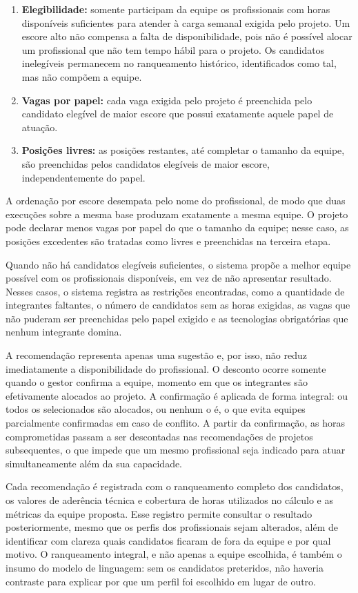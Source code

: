 \begin{enumerate}
    \item \textbf{Elegibilidade:} somente participam da equipe os profissionais com horas disponíveis suficientes para atender à carga semanal exigida pelo projeto. Um escore alto não compensa a falta de disponibilidade, pois não é possível alocar um profissional que não tem tempo hábil para o projeto. Os candidatos inelegíveis permanecem no ranqueamento histórico, identificados como tal, mas não compõem a equipe.
    \item \textbf{Vagas por papel:} cada vaga exigida pelo projeto é preenchida pelo candidato elegível de maior escore que possui exatamente aquele papel de atuação.
    \item \textbf{Posições livres:} as posições restantes, até completar o tamanho da equipe, são preenchidas pelos candidatos elegíveis de maior escore, independentemente do papel.
\end{enumerate}

A ordenação por escore desempata pelo nome do profissional, de modo que duas execuções sobre a mesma base produzam exatamente a mesma equipe. O projeto pode declarar menos vagas por papel do que o tamanho da equipe; nesse caso, as posições excedentes são tratadas como livres e preenchidas na terceira etapa.

Quando não há candidatos elegíveis suficientes, o sistema propõe a melhor equipe possível com os profissionais disponíveis, em vez de não apresentar resultado. Nesses casos, o sistema registra as restrições encontradas, como a quantidade de integrantes faltantes, o número de candidatos sem as horas exigidas, as vagas que não puderam ser preenchidas pelo papel exigido e as tecnologias obrigatórias que nenhum integrante domina.

A recomendação representa apenas uma sugestão e, por isso, não reduz imediatamente a disponibilidade do profissional. O desconto ocorre somente quando o gestor confirma a equipe, momento em que os integrantes são efetivamente alocados ao projeto. A confirmação é aplicada de forma integral: ou todos os selecionados são alocados, ou nenhum o é, o que evita equipes parcialmente confirmadas em caso de conflito. A partir da confirmação, as horas comprometidas passam a ser descontadas nas recomendações de projetos subsequentes, o que impede que um mesmo profissional seja indicado para atuar simultaneamente além da sua capacidade.

Cada recomendação é registrada com o ranqueamento completo dos candidatos, os valores de aderência técnica e cobertura de horas utilizados no cálculo e as métricas da equipe proposta. Esse registro permite consultar o resultado posteriormente, mesmo que os perfis dos profissionais sejam alterados, além de identificar com clareza quais candidatos ficaram de fora da equipe e por qual motivo. O ranqueamento integral, e não apenas a equipe escolhida, é também o insumo do modelo de linguagem: sem os candidatos preteridos, não haveria contraste para explicar por que um perfil foi escolhido em lugar de outro.

